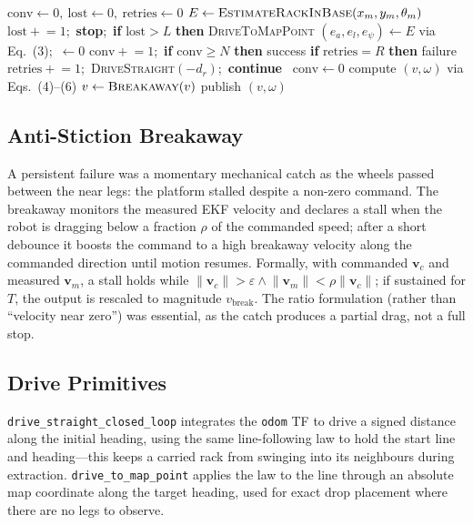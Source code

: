 \documentclass[11pt,a4paper]{article}
\newcommand{\code}[1]{\texttt{\small #1}}
\begin{document}
\begin{algorithm}[h]
\caption{Leg-servo docking (15\,Hz)}\label{alg:dock}
\begin{algorithmic}[1]
\State $\text{conv}\gets0,\ \text{lost}\gets0,\ \text{retries}\gets0$
  \State $E \gets \textsc{EstimateRackInBase}(x_m,y_m,\theta_m)$
     \State $\text{lost}\mathrel{+}=1$;\ \textbf{stop};\ \textbf{if} $\text{lost}>L$ \textbf{then} \Return \textsc{DriveToMapPoint}
  \Else
     \State $(e_a,e_l,e_\psi)\gets E$ via Eq.~(3);\ $\gets0$
           \State $\text{conv}\mathrel{+}=1$;\ \textbf{if} $\text{conv}\ge N$ \textbf{then} \Return success
        \Else
           \State \textbf{if} $\text{retries}=R$ \textbf{then} \Return failure
           \State $\text{retries}\mathrel{+}=1$;\ \textsc{DriveStraight}$(-d_r)$;\ \textbf{continue}
        \EndIf
     \Else\ $\text{conv}\gets0$ \EndIf
     \State compute $(v,\omega)$ via Eqs.~(4)--(6)
     \State $v\gets\textsc{Breakaway}(v)$ 
     \State publish $(v,\omega)$
  \EndIf
\EndWhile
\end{algorithmic}
\end{algorithm}

\subsection{Anti-Stiction Breakaway}
A persistent failure was a momentary mechanical catch as the wheels passed
between the near legs: the platform stalled despite a non-zero command. The
breakaway monitors the measured EKF velocity and declares a stall when the
robot is dragging below a fraction $\rho$ of the commanded speed; after a
short debounce it boosts the command to a high breakaway velocity along the
commanded direction until motion resumes. Formally, with commanded
$\mathbf v_c$ and measured $\mathbf v_m$, a stall holds while
$\lVert\mathbf v_c\rVert>\varepsilon \wedge \lVert\mathbf v_m\rVert<\rho\lVert\mathbf v_c\rVert$;
if sustained for $T$, the output is rescaled to magnitude $v_\text{break}$.
The ratio formulation (rather than ``velocity near zero'') was essential, as
the catch produces a partial drag, not a full stop.

\subsection{Drive Primitives}
\code{drive\_straight\_closed\_loop} integrates the \code{odom} TF to drive a
signed distance along the initial heading, using the same line-following law
to hold the start line and heading---this keeps a carried rack from swinging
into its neighbours during extraction. \code{drive\_to\_map\_point} applies
the law to the line through an absolute map coordinate along the target
heading, used for exact drop placement where there are no legs to observe.
\end{document}
